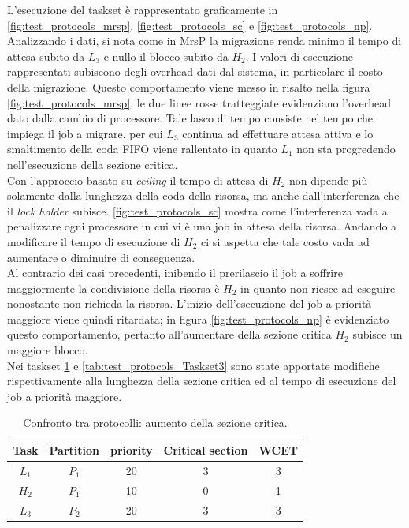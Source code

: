\noindent L'esecuzione del taskset è rappresentato graficamente in \ref{fig:test_protocols_mrsp}, \ref{fig:test_protocols_sc} e \ref{fig:test_protocols_np}. Analizzando i dati, si nota come in MrsP la migrazione renda minimo il tempo di attesa subito da $L_3$ e nullo il blocco subito da $H_2$. I valori di esecuzione rappresentati subiscono degli overhead dati dal sistema, in particolare il costo della migrazione. Questo comportamento viene messo in risalto nella figura \ref{fig:test_protocols_mrsp}, le due linee rosse tratteggiate evidenziano l'overhead dato dalla cambio di processore. Tale lasco di tempo consiste nel tempo che impiega il job a migrare, per cui $L_3$ continua ad effettuare attesa attiva e lo smaltimento della coda FIFO viene rallentato in quanto $L_1$ non sta progredendo nell'esecuzione della sezione critica.\\
Con l'approccio basato su \textit{ceiling} il tempo di attesa di $H_2$ non dipende più solamente dalla lunghezza della coda della risorsa, ma anche dall'interferenza che il \textit{lock holder} subisce. \ref{fig:test_protocols_sc} mostra come l'interferenza vada a penalizzare ogni processore in cui vi è una job in attesa della risorsa. Andando a modificare il tempo di esecuzione di $H_2$ ci si aspetta che tale costo vada ad aumentare o diminuire di conseguenza.\\
Al contrario dei casi precedenti, inibendo il prerilascio il job a soffrire maggiormente la condivisione della risorsa è $H_2$ in quanto non riesce ad eseguire nonostante non richieda la risorsa. L'inizio dell'esecuzione del job a priorità maggiore viene quindi ritardata; in figura \ref{fig:test_protocols_np} è evidenziato questo comportamento, pertanto all'aumentare della sezione critica $H_2$ subisce un maggiore blocco.\\

\noindent Nei taskset  \ref{tab:test_protocols_Taskset2} e \ref{tab:test_protocols_Taskset3} sono state apportate modifiche rispettivamente alla lunghezza della sezione critica ed al tempo di esecuzione del job a priorità maggiore.\\

\begin{table}
  \centering
  \begin{tabular}{ccccc}
  \hline\hline
    Task & Partition     & priority & Critical section & WCET  \\ \hline
    $L_1$ & $P_1$  & 20 & 3 & 3 \\
    $H_2$ & $P_1$  & 10 & 0 & 1 \\
    $L_3$ & $P_2$  & 20 & 3 & 3 \\
    \hline
    \end{tabular}
  \caption{Confronto tra protocolli: aumento della sezione critica.}
  \label{tab:test_protocols_Taskset2}
  \end{table}

